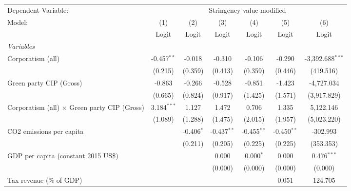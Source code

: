 
\begingroup
\centering
\begin{tabular}{lcccccc}
   \toprule
   Dependent Variable: & \multicolumn{6}{c}{Stringency value modified}\\
   Model:                                              & (1)           & (2)          & (3)           & (4)           & (5)           & (6)\\  
                                                       &  Logit        & Logit        & Logit         & Logit         & Logit         & Logit\\  
   \midrule
   \emph{Variables}\\
   Corporatism (all)                                   & -0.457$^{**}$ & -0.018       & -0.310        & -0.106        & -0.290        & -3,392.688$^{***}$\\   
                                                       & (0.215)       & (0.359)      & (0.413)       & (0.359)       & (0.446)       & (419.516)\\   
   Green party CIP (Gross)                             & -0.863        & -0.266       & -0.528        & -0.851        & -1.423        & -4,727.034\\   
                                                       & (0.665)       & (0.824)      & (0.917)       & (1.425)       & (1.571)       & (3,917.829)\\   
   Corporatism (all) $\times$ Green party CIP (Gross)  & 3.184$^{***}$ & 1.127        & 1.472         & 0.706         & 1.335         & 5,122.146\\   
                                                       & (1.089)       & (1.288)      & (1.475)       & (2.015)       & (1.957)       & (5,023.220)\\   
   CO2 emissions per capita                            &               & -0.406$^{*}$ & -0.437$^{**}$ & -0.455$^{**}$ & -0.450$^{**}$ & -302.993\\   
                                                       &               & (0.211)      & (0.205)       & (0.225)       & (0.225)       & (353.353)\\   
   GDP per capita (constant 2015 US\$)                 &               &              & 0.000         & 0.000$^{*}$   & 0.000         & 0.476$^{***}$\\   
                                                       &               &              & (0.000)       & (0.000)       & (0.000)       & (0.000)\\   
   Tax revenue (\% of GDP)                             &               &              &               &               & 0.051         & 124.705\\   

\end{tabular}
